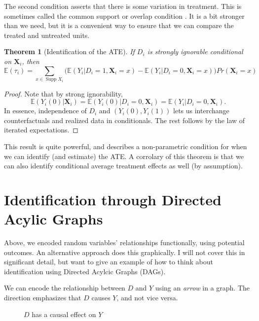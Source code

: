 \documentclass{tufte-handout}
\theoremstyle{break}
\newtheorem{thmN}{Theorem}
\newtheorem{proof}{Proof}
\DeclareMathOperator{\Supp}{Supp}
\begin{document}
The second condition asserts that there is some variation in treatment. This is sometimes called the common support or overlap condition . It is a bit stronger than we need, but it is a convenient way to ensure that we can compare the treated and untreated units.

\begin{thmN}[Identification of the ATE]
  \label{thm:ate_identification}
If $D_{i}$ is strongly ignorable conditional on $\mathbf{X}_{i}$, then
  \begin{equation*}
    \mathbb{E}(\tau_{i}) = \sum_{x \in \Supp X_{i}} \bigg(\mathbb{E}(Y_{i} | D_{i} = 1, \mathbf{X}_{i} = x) - \mathbb{E}(Y_{i} | D_{i} = 0, \mathbf{X}_{i} = x)\bigg)Pr(\mathbf{X}_{i} = x)
  \end{equation*}
\end{thmN}
\begin{proof}
  Note that by strong ignorability,
  \begin{equation*}
    \mathbb{E}(Y_{i}(0) | \mathbf{X}_{i} ) = \mathbb{E}(Y_{i}(0) | D_{i} = 0, \mathbf{X}_{i} ) = \mathbb{E}(Y_{i}
  | D_{i} = 0, \mathbf{X}_{i}).
  \end{equation*} 
  In essence,
  independence of $D_{i}$ and $(Y_{i}(0), Y_{i}(1))$ lets us
  interchange counterfactuals and realized data in conditionals. The
  rest follows by the law of iterated expectations. 
\end{proof}

This result is quite powerful, and describes a non-parametric condition for when we can identify (and estimate) the ATE. A corrolary of this theorem is that we can also identify conditional average treatment effects as well (by assumption).

\section{Identification through Directed Acylic Graphs}

Above, we encoded random variables' relationships functionally, using potential outcomes. An alternative approach does this graphically. I will not cover this in significant detail, but want to give an example of how to think about identification using Directed Acylcic Graphs (DAGs). 

 We can encode the relationship between $D$ and $Y$ using an \emph{arrow} in a graph. The direction emphasizes that $D$ causes $Y$, and not vice versa.  
 
 \begin{figure}
  \begin{center}
   \caption{$D$ has a causal effect on $Y$}
  \end{center}
  \end{figure}
\end{document}
